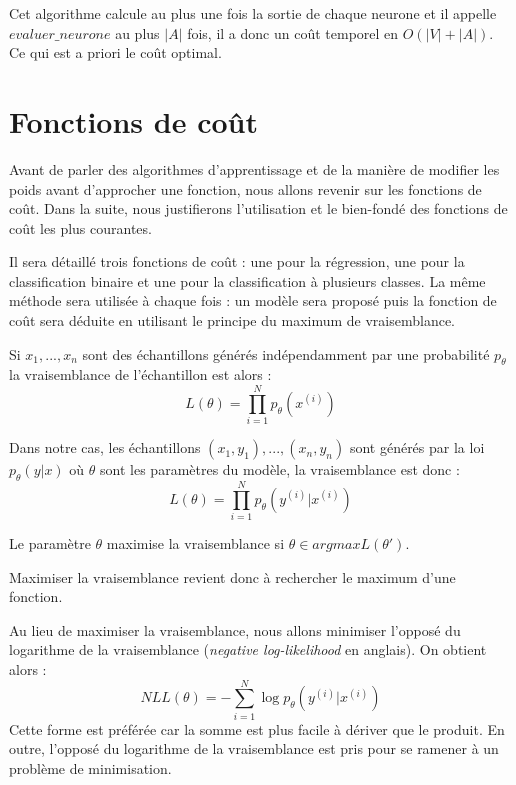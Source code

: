 Cet algorithme calcule au plus une fois la sortie de chaque neurone et il appelle $evaluer\_neurone$ au plus $|A|$ fois, il a donc un coût temporel en $O(|V|+|A|)$. Ce qui est a priori le coût optimal.

\section{Fonctions de coût}

Avant de parler des algorithmes d'apprentissage et de la manière de modifier les poids avant d'approcher une fonction, nous allons revenir sur les fonctions de coût. Dans la suite, nous justifierons l'utilisation et le bien-fondé des fonctions de coût les plus courantes.

Il sera détaillé trois fonctions de coût : une pour la régression, une pour la classification binaire et une pour la classification à plusieurs classes. La même méthode sera utilisée à chaque fois : un modèle sera proposé puis la fonction de coût sera déduite en utilisant le principe du maximum de vraisemblance.

\begin{definition}
Si $x_1, ..., x_n$ sont des échantillons générés indépendamment par une probabilité $p_{\theta}$ la vraisemblance de l'échantillon est alors :
$$
L(\theta) = \prod_{i=1}^{N}{p_{\theta}(x^{(i)})}
$$
\end{definition}

\begin{remark}
Dans notre cas, les échantillons $(x_1, y_1), ..., (x_n, y_n)$ sont générés par la loi $p_{\theta}(y|x)$ où $\theta$ sont les paramètres du modèle, la vraisemblance est donc :
$$
L(\theta) = \prod_{i=1}^{N}{p_{\theta}(y^{(i)}|x^{(i)})}
$$
\end{remark}

\begin{definition}
Le paramètre $\theta$ maximise la vraisemblance si $\theta \in argmax L(\theta')$.
\end{definition}

\begin{remark}
Maximiser la vraisemblance revient donc à rechercher le maximum d'une fonction.
\end{remark}

\begin{remark}
Au lieu de maximiser la vraisemblance, nous allons minimiser l'opposé du logarithme de la vraisemblance (\textit{negative log-likelihood} en anglais). On obtient alors :
\begin{equation}
NLL(\theta) = -\sum_{i=1}^{N}{\log{p_{\theta}(y^{(i)}|x^{(i)})}}
\label{NLL}
\end{equation}
Cette forme est préférée car la somme est plus facile à dériver que le produit. En outre, l'opposé du logarithme de la vraisemblance est pris pour se ramener à un problème de minimisation.
\end{remark}

